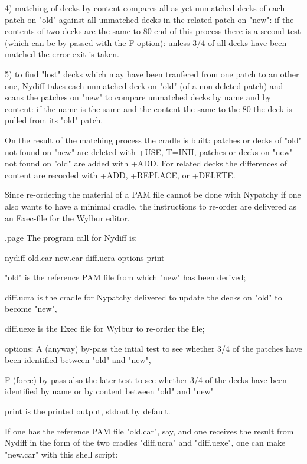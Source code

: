  4) matching of decks by content compares all as-yet unmatched
    decks of each patch on "old" against all unmatched decks
    in the related patch on "new": if the contents of two decks
    are the same to 80%
    end of this process there is a second test (which can be
    by-passed with the F option): unless 3/4 of all decks have
    been matched the error exit is taken.

 5) to find "lost" decks which may have been tranfered from one
    patch to an other one, Nydiff takes each unmatched deck on
    "old" (of a non-deleted patch) and scans the patches on "new"
    to compare unmatched decks by name and by content: if the
    name is the same and the content the same to the 80%
    the deck is pulled from its "old" patch.

On the result of the matching process the cradle is built:
patches or decks of "old" not found on "new" are deleted with
+USE, T=INH, patches or decks on "new" not found on "old" are
added with +ADD. For related decks the differences of content
are recorded with +ADD, +REPLACE, or +DELETE.

Since re-ordering the material of a PAM file cannot be done
with Nypatchy if one also wants to have a minimal cradle,
the instructions to re-order are delivered as an Exec-file
for the Wylbur editor.

.page
The program call for Nydiff is:

      nydiff  old.car  new.car  diff.ucra  options  print

   "old" is the reference PAM file from which "new" has been derived;

   diff.ucra  is the cradle for Nypatchy delivered to update the
              decks on "old" to become "new",

   diff.uexe  is the Exec file for Wylbur to re-order the file;

   options:  A  (anyway) by-pass the intial test to see whether
                3/4 of the patches have been identified between
                "old" and "new",

             F  (force) by-pass also the later test to see whether
                3/4 of the decks have been identified by name or
                by content between "old" and "new"

   print      is the printed output, stdout by default.


If one has the reference PAM file "old.car", say, and one receives
the result from Nydiff in the form of the two cradles "diff.ucra"
and "diff.uexe", one can make "new.car" with this shell script:

